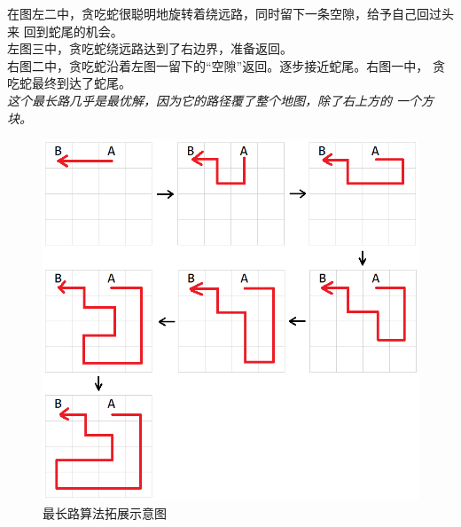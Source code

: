 \documentclass[a4paper]{article}
\begin{document}
在图左二中，贪吃蛇很聪明地旋转着绕远路，同时留下一条空隙，给予自己回过头来
回到蛇尾的机会。\\

左图三中，贪吃蛇绕远路达到了右边界，准备返回。\\

右图二中，贪吃蛇沿着左图一留下的``空隙''返回。逐步接近蛇尾。右图一中，
贪吃蛇最终到达了蛇尾。\\

\emph{这个最长路几乎是最优解，因为它的路径覆了整个地图，除了右上方的
一个方块。}
\begin{figure}[!hbt]
    \begin{center}
    \includegraphics[scale=0.4]{assets/build-longest.png}
    \caption{最长路算法拓展示意图\label{fig:build-longest}} 
    \end{center} 
\end{figure} 
\end{document}
